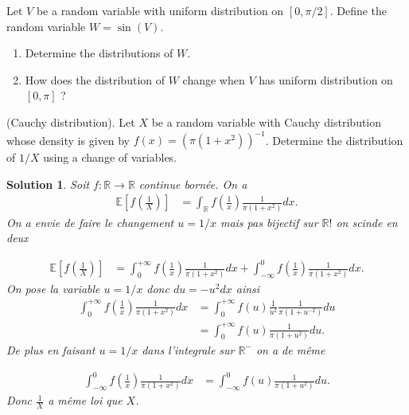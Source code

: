 \documentclass{article}
\newtheorem{solution}{Solution}
\begin{document}
\begin{Exercise} Let $V$ be a random variable with uniform distribution on $[0, \pi / 2]$. Define the random variable $W=\sin (V)$.

  \begin{enumerate}
    \item Determine the distributions of $W$.

    \item How does the distribution of $W$ change when $V$ has uniform distribution on
          $[0, \pi]$ ?

  \end{enumerate}

\end{Exercise}

\begin{Exercise} (Cauchy distribution). Let $X$ be a random variable with Cauchy distribution whose density is given by $f(x)=\left(\pi\left(1+x^{2}\right)\right)^{-1}$. Determine the distribution of $1 / X$ using a change of variables.

\end{Exercise}

\begin{solution}
  Soit $f:\mathbb R\longrightarrow \mathbb R$ continue born\'ee. On a
  \begin{align*}
    \mathbb E[f(\frac1X)] & =\int_\mathbb R f(\frac1x) \frac{1}{\pi(1+x^2)} dx.
  \end{align*}
  On a envie de faire le changement $u=1/x$ mais pas bijectif sur $\mathbb R!$ on scinde en deux

  \begin{align*}
    \mathbb E[f(\frac1X)] & =\int_0^{+\infty} f(\frac1x) \frac{1}{\pi(1+x^2)} dx+ \int_{-\infty}^0 f(\frac1x) \frac{1}{\pi(1+x^2)} dx.
  \end{align*}
  On pose la variable $u=1/x$ donc $du=-u^2 dx$ ainsi
  \begin{align*}
    \int_0^{+\infty} f(\frac1x) \frac{1}{\pi(1+x^2)} dx & =\int_0^{+\infty} f(u)\frac{1}{u^2}  \frac{1}{\pi(1+u^{-2})} du \\
                                                        & =\int_0^{+\infty} f(u) \frac{1}{\pi(1+u^2)} du.
  \end{align*}
  De plus en faisant $u=1/x$ dans l'integrale sur $\mathbb R^-$ on a de m\^eme

  \begin{align*}
    \int_{-\infty}^0 f(\frac1x) \frac{1}{\pi(1+x^2)} dx & =\int_{-\infty}^0 f(u) \frac{1}{\pi(1+u^2)} du.
  \end{align*}
  Donc $\frac1X$ a m\^eme loi que $X$.
\end{solution}
\end{document}
